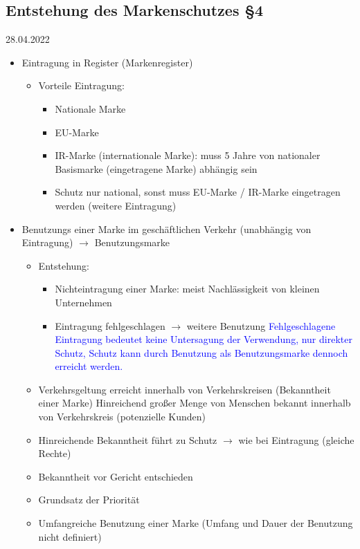 \documentclass{report}
\begin{document}
\subsection{Entstehung des Markenschutzes §4}
28.04.2022
\begin{itemize}
	\item Eintragung in Register (Markenregister)
	\begin{itemize}
		\item Vorteile Eintragung:
		\begin{itemize}
			\item Nationale Marke
			\item EU-Marke
			\item IR-Marke (internationale Marke): muss 5 Jahre von nationaler Basismarke (eingetragene Marke) abhängig sein
			\item Schutz nur national, sonst muss EU-Marke / IR-Marke eingetragen werden (weitere Eintragung)
		\end{itemize}
	\end{itemize}
	\item Benutzungs einer Marke im geschäftlichen Verkehr (unabhängig von Eintragung)
	\newline $\rightarrow$ Benutzungsmarke
	\begin{itemize}
		\item Entstehung:
		\begin{itemize}
			\item Nichteintragung einer Marke: meist Nachlässigkeit von kleinen Unternehmen
			\item Eintragung fehlgeschlagen $\rightarrow$ weitere Benutzung
			\newline \textcolor{blue}{Fehlgeschlagene Eintragung bedeutet keine Untersagung der Verwendung, nur direkter Schutz, Schutz kann durch Benutzung als Benutzungsmarke dennoch erreicht werden.}
		\end{itemize}
		\item Verkehrsgeltung erreicht innerhalb von Verkehrskreisen (Bekanntheit einer Marke)
		\newline Hinreichend großer Menge von Menschen bekannt innerhalb von Verkehrskreis (potenzielle Kunden)
		\item Hinreichende Bekanntheit führt zu Schutz $\rightarrow$ wie bei Eintragung (gleiche Rechte)
		\item Bekanntheit vor Gericht entschieden
		\item Grundsatz der Priorität
		\item Umfangreiche Benutzung einer Marke (Umfang und Dauer der Benutzung nicht definiert)

\end{itemize}
\end{itemize}
\end{document}
